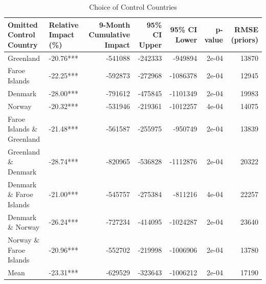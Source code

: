 \begin{table}

\caption{Choice of Control Countries}
\centering
\begin{tabular}[t]{l|l|r|r|r|r|r}
\hline
Omitted Control Country & Relative Impact (\%) & 9-Month Cumulative Impact & 95\% CI Upper & 95\% CI Lower & p-value & RMSE (priors)\\
\hline
Greenland & -20.76*** & -541088 & -242333 & -949894 & 2e-04 & 13870\\
\hline
Faroe Islands & -22.25*** & -592873 & -272968 & -1086378 & 2e-04 & 12945\\
\hline
Denmark & -28.00*** & -791612 & -475845 & -1101349 & 2e-04 & 19983\\
\hline
Norway & -20.32*** & -531946 & -219361 & -1012257 & 4e-04 & 14075\\
\hline
Faroe Islands \& Greenland & -21.48*** & -561587 & -255975 & -950749 & 2e-04 & 13839\\
\hline
Greenland \& Denmark & -28.74*** & -820965 & -536828 & -1112876 & 2e-04 & 20322\\
\hline
Denmark \& Faroe Islands & -21.00*** & -545757 & -275384 & -811216 & 4e-04 & 22257\\
\hline
Denmark \& Norway & -26.24*** & -727234 & -414095 & -1024287 & 2e-04 & 23640\\
\hline
Norway \& Faroe Islands & -20.96*** & -552702 & -219998 & -1006906 & 2e-04 & 13780\\
\hline
Mean & -23.31*** & -629529 & -323643 & -1006212 & 2e-04 & 17190\\
\hline
\end{tabular}
\end{table}
